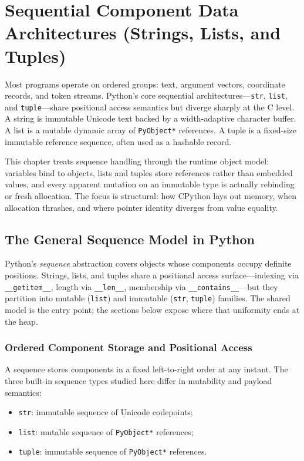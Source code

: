 \documentclass[a4paper,twoside]{report}
\begin{document}
\chapter{Sequential Component Data Architectures (Strings, Lists, and Tuples)}

Most programs operate on ordered groups: text, argument vectors, coordinate records, and token streams. Python's core sequential architectures---\texttt{str}, \texttt{list}, and \texttt{tuple}---share positional access semantics but diverge sharply at the C level. A string is immutable Unicode text backed by a width-adaptive character buffer. A list is a mutable dynamic array of \texttt{PyObject*} references. A tuple is a fixed-size immutable reference sequence, often used as a hashable record.

This chapter treats sequence handling through the runtime object model: variables bind to objects, lists and tuples store references rather than embedded values, and every apparent mutation on an immutable type is actually rebinding or fresh allocation. The focus is structural: how CPython lays out memory, when allocation thrashes, and where pointer identity diverges from value equality.


\section{The General Sequence Model in Python}

Python's \emph{sequence} abstraction covers objects whose components occupy definite positions. Strings, lists, and tuples share a positional access surface---indexing via \texttt{\_\_getitem\_\_}, length via \texttt{\_\_len\_\_}, membership via \texttt{\_\_contains\_\_}---but they partition into mutable (\texttt{list}) and immutable (\texttt{str}, \texttt{tuple}) families. The shared model is the entry point; the sections below expose where that uniformity ends at the heap.


\subsection{Ordered Component Storage and Positional Access}

A sequence stores components in a fixed left-to-right order at any instant. The three built-in sequence types studied here differ in mutability and payload semantics:

\begin{itemize}
    \item \texttt{str}: immutable sequence of Unicode codepoints;
    \item \texttt{list}: mutable sequence of \texttt{PyObject*} references;
    \item \texttt{tuple}: immutable sequence of \texttt{PyObject*} references.
\end{itemize}
\end{document}
